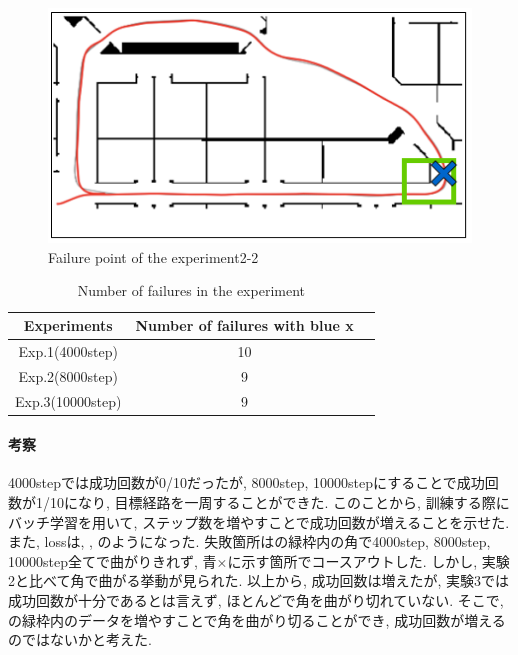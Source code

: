 \begin{figure}[h]
  \centering
  \includegraphics[keepaspectratio, scale=0.6]{images/result3.png}
  \caption{Failure point of the experiment2-2}
  \label{Fig:result3}
  \end{figure}

\begin{table}[h]
  \centering
  \begin{tabular}{|c|c|c|} \hline
    Experiments & Number of failures with blue x \\ \hline
    Exp.1(4000step) & 10 \\ \hline
    Exp.2(8000step) & 9 \\ \hline
    Exp.3(10000step) & 9 \\ \hline
  \end{tabular}
  \caption{Number of failures in the experiment}
  \label{tb:fail3}
\end{table}

\paragraph{考察}
4000stepでは成功回数が0/10だったが, 8000step, 10000stepにすることで成功回数が1/10になり, 目標経路を一周することができた. このことから, 訓練する際にバッチ学習を用いて, ステップ数を増やすことで成功回数が増えることを示せた. また, lossは, , のようになった. 失敗箇所はの緑枠内の角で4000step, 8000step, 10000step全てで曲がりきれず, 青×に示す箇所でコースアウトした. しかし, 実験2と比べて角で曲がる挙動が見られた. 以上から, 成功回数は増えたが, 実験3では成功回数が十分であるとは言えず, ほとんどで角を曲がり切れていない. そこで, の緑枠内のデータを増やすことで角を曲がり切ることができ, 成功回数が増えるのではないかと考えた. 

